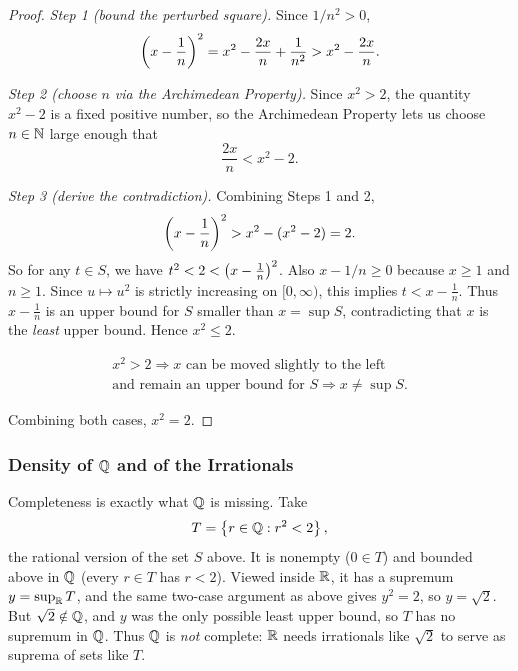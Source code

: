 \begin{proof}
    \textit{Step 1 (bound the perturbed square).} Since $1/n^2>0$,
    \begin{equation*}
        \left(x - \frac{1}{n}\right)^2 = x^2 - \frac{2x}{n} + \frac{1}{n^2} > x^2 - \frac{2x}{n}.
    \end{equation*}

    \textit{Step 2 (choose $n$ via the Archimedean Property).} Since $x^2>2$, the quantity $x^2-2$ is a fixed positive number, so the Archimedean Property lets us choose $n\in\mathbb{N}$ large enough that
    \begin{equation*}
        \frac{2x}{n} < x^2 - 2.
    \end{equation*}

    \textit{Step 3 (derive the contradiction).} Combining Steps 1 and 2,
    \begin{equation*}
        \left(x - \frac{1}{n}\right)^2 > x^2 - (x^2 - 2) = 2.
    \end{equation*}
    So for any $t \in S$, we have $t^2 < 2 < \left(x - \frac{1}{n}\right)^2$. Also $x-1/n\geq0$ because $x\geq1$ and $n\geq1$. Since $u\mapsto u^2$ is strictly increasing on $[0,\infty)$, this implies $t < x-\frac1n$. Thus $x - \frac{1}{n}$ is an upper bound for $S$ smaller than $x = \sup S$, contradicting that $x$ is the \emph{least} upper bound. Hence $x^2 \leq 2$.

    \[
        \boxed{
        \begin{array}{c}
            x^2>2 \Longrightarrow x\text{ can be moved slightly to the left} \\
            \text{and remain an upper bound for }S \Longrightarrow x\neq\sup S.
        \end{array}
        }
    \]

    Combining both cases, $x^2 = 2$.
\end{proof}

\subsubsection{Density of \texorpdfstring{$\mathbb{Q}$}{Q} and of the Irrationals}

Completeness is exactly what $\mathbb{Q}$ is missing. Take
\[
    T=\left\{r\in\mathbb{Q} : r^2<2\right\},
\]
the rational version of the set $S$ above. It is nonempty ($0\in T$) and bounded above in $\mathbb{Q}$ (every $r\in T$ has $r<2$). Viewed inside $\mathbb{R}$, it has a supremum $y=\sup_{\mathbb{R}} T$, and the same two-case argument as above gives $y^2=2$, so $y=\sqrt2$. But $\sqrt2\notin\mathbb{Q}$, and $y$ was the only possible least upper bound, so $T$ has no supremum in $\mathbb{Q}$. Thus $\mathbb{Q}$ is \emph{not} complete: $\mathbb{R}$ needs irrationals like $\sqrt2$ to serve as suprema of sets like $T$.

